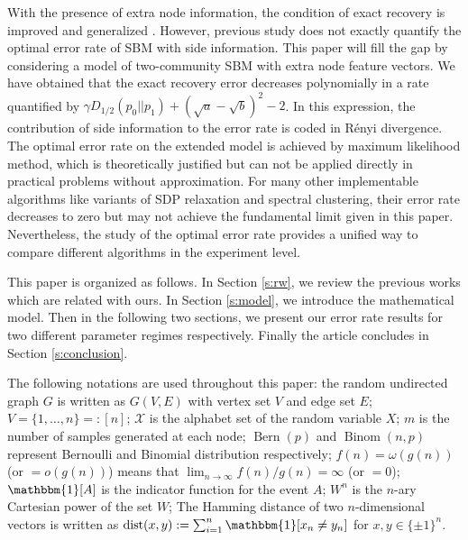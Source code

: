 \documentclass[conference,letterpaper]{IEEEtran}
\DeclareMathOperator{\dist}{dist}
\DeclareMathOperator{\Bern}{Bern}
\DeclareMathOperator{\Binom}{Binom}
\begin{document}
With the presence of extra node information, the condition of exact recovery is improved
and generalized \cite{saad2018community}. However, previous study does not exactly quantify the optimal error rate of SBM with side information. This paper will fill the gap by considering a model of two-community SBM with extra node feature vectors. We have obtained that
the exact recovery error decreases polynomially in a rate quantified by $\gamma D_{1/2}(p_0 || p_1) + (\sqrt{a} - \sqrt{b})^2 -2$. In this expression,
the contribution of side information to the error rate is coded in Rényi divergence.
The optimal error rate on the extended model is achieved by maximum likelihood method, which is theoretically justified but can not be applied directly in practical problems without approximation. For many other implementable algorithms like variants of SDP relaxation and
spectral clustering, their error rate decreases to zero but may not achieve the fundamental limit given in this paper. Nevertheless, the study of the optimal error rate provides a unified way to compare
different algorithms in the experiment level.



This paper is organized as follows. In Section \ref{s:rw}, we review the previous works which are related with ours.
In Section \ref{s:model}, we introduce the mathematical model. Then in the following two sections,
we present our error rate results for two different parameter regimes respectively.
Finally the article concludes in Section \ref{s:conclusion}.

The following notations are used throughout this paper: 
the random undirected graph $G$ is written as $G(V,E)$ with vertex set $V$ and edge set $E$;
$V=\{1,\dots, n\} =: [n]$;
$\mathcal{X}$ is the alphabet set
of the random variable $X$; $m$ is the number of samples generated at each node;
$\Bern(p)$ and $\Binom(n,p)$ represent Bernoulli
and Binomial distribution respectively; $f(n)=\omega(g(n))$ (or $=o(g(n))$) means that $\lim_{n\to \infty} f(n) / g(n) = \infty $ (or $=0$);
$\mathbbm{1}[A]$ is the indicator function for the event $A$; $W^n$ is the $n$-ary Cartesian power of the set $W$;
The Hamming distance of 
two $n$-dimensional vectors is written as $\dist(x,y):=\sum_{i=1}^n \mathbbm{1}[x_n\neq y_n]$ for $x,y\in \{\pm 1 \}^n$.
\end{document}
